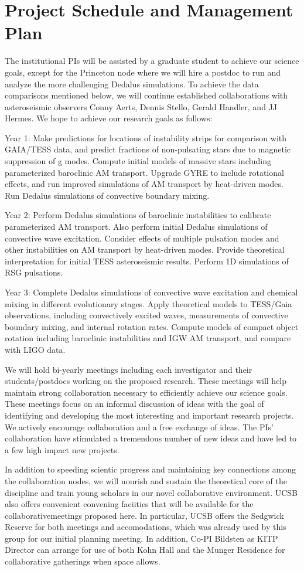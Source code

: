 \section{Project Schedule and Management Plan}

The institutional PIs will be assisted by a graduate student to achieve our science goals, except for the Princeton node where we will hire a postdoc to run and analyze the more challenging Dedalus simulations. To achieve the data comparisons mentioned below, we will continue established collaborations with asteroseismic observers Conny Aerts, Dennis Stello, Gerald Handler, and JJ Hermes. We hope to achieve our research goals as follows:

Year 1: Make predictions for locations of instability strips for comparison with GAIA/TESS data, and predict fractions of non-pulsating stars due to magnetic suppression of g modes. Compute initial models of massive stars including parameterized baroclinic AM transport. Upgrade GYRE to include rotational effects, and run improved simulations of AM transport by heat-driven modes. Run Dedalus simulations of convective boundary mixing.

Year 2: Perform Dedalus simulations of baroclinic instabilities to calibrate parameterized AM transport. Also perform initial Dedalus simulations of convective wave excitation. Consider effects of multiple pulsation modes and other instabilities on AM transport by heat-driven modes. Provide theoretical interpretation for initial TESS asteroseismic results. Perform 1D simulations of RSG pulsations.

Year 3: Complete Dedalus simulations of convective wave excitation and chemical mixing in different evolutionary stages. Apply theoretical models to TESS/Gaia observations, including convectively excited waves, measurements of convective boundary mixing, and internal rotation rates. Compute models of compact object rotation including baroclinic instabilities and IGW AM transport, and compare with LIGO data.

We will hold bi-yearly meetings including each investigator and their students/postdocs working on the proposed research. These meetings will help maintain strong collaboration necessary to efficiently achieve our science goals. These meetings focus on an informal discussion of ideas with the goal of identifying and developing the most interesting and important research projects. We actively encourage collaboration and a free exchange of ideas. The PIs' collaboration have stimulated a tremendous number of new ideas and have led to a few high impact new projects.

In addition to speeding scientic progress and maintaining
key connections among the collaboration nodes, we will nourish and sustain the theoretical
core of the discipline and train young scholars in our novel collaborative environment. UCSB also offers convenient convening faciities that will be available for the collaborativemeetings proposed here. In particular, UCSB offers the Sedgwick Reserve for both meetings and accomodations, which was already used by this group for our initial planning meeting. In addition,
Co-PI Bildsten as KITP Director can arrange for use of both Kohn Hall and the Munger Residence for
collaborative gatherings when space allows.
